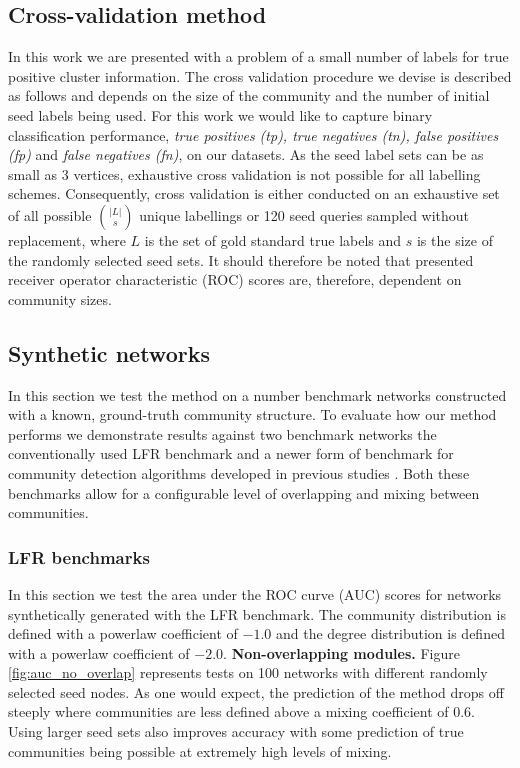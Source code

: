 \documentclass[a4paper,10pt]{article}
\begin{document}
\subsection{Cross-validation method}
\label{sec:cross_validation}
In this work we are presented with a problem of a small number of labels for true positive cluster information.
The cross validation procedure we devise is described as follows and depends on the size of the community and the number of initial seed labels being used.
For this work we would like to capture binary classification  performance, \textit{true positives (tp), true negatives (tn), false positives (fp)} and \textit{false negatives (fn)}, on our datasets.
As the seed label sets can be as small as 3 vertices, exhaustive cross validation is not possible for all labelling schemes.
Consequently, cross validation is either conducted on an exhaustive set of all possible $\binom{|L|}{s}$ unique labellings or 120 seed queries sampled without replacement, where $L$ is the set of gold standard true labels and $s$ is the size of the randomly selected seed sets.
It should therefore be noted that presented receiver operator characteristic (ROC) scores are, therefore, dependent on community sizes.

\subsection{Synthetic networks}
In this section we test the method on a number benchmark networks constructed with a known, ground-truth community structure.
To evaluate how our method performs we demonstrate results against two benchmark networks the conventionally used LFR benchmark \cite{lfr} and a newer form of benchmark for community detection algorithms developed in previous studies \cite{cigram}.
Both these benchmarks allow for a configurable level of overlapping and mixing between communities.

\subsubsection{LFR benchmarks}
In this section we test the area under the ROC curve (AUC) scores for networks synthetically generated with the LFR benchmark.
The community distribution is defined with a powerlaw coefficient of $-1.0$ and the degree distribution is defined with a powerlaw coefficient of $-2.0$.
\textbf{Non-overlapping modules.} Figure \ref{fig:auc_no_overlap} represents tests on 100 networks with different randomly selected seed nodes.
As one would expect, the prediction of the method drops off steeply where communities are less defined above a mixing coefficient of 0.6.
Using larger seed sets also improves accuracy with some prediction of true communities being possible at extremely high levels of mixing.
\end{document}
